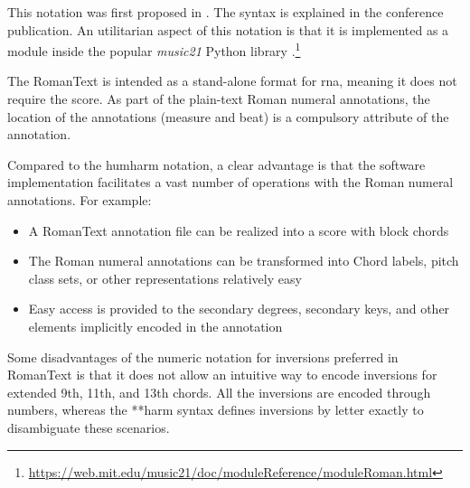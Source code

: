 

This notation was first proposed in
\textcite{gotham2019romantext}. The syntax is explained in
the conference publication. An utilitarian aspect of this
notation is that it is implemented as a module inside the
popular \emph{music21} Python library
\textcite{cuthbert2010music21}.\footnote{\href{https://web.mit.edu/music21/doc/moduleReference/moduleRoman.html}{https://web.mit.edu/music21/doc/moduleReference/moduleRoman.html}}


The RomanText is intended as a stand-alone format for
\gls{rna}, meaning it does not require the score. As part of
the plain-text Roman numeral annotations, the location of
the annotations (measure and beat) is a compulsory attribute
of the annotation.

Compared to the \gls{humharm} notation, a clear advantage is
that the software implementation facilitates a vast number
of operations with the Roman numeral annotations. For
example:

\begin{itemize}
    \item A RomanText annotation file can be realized into a
    score with block chords
    \item The Roman numeral annotations can be transformed
    into Chord labels, pitch class sets, or other
    representations relatively easy
    \item Easy access is provided to the secondary degrees,
    secondary keys, and other elements implicitly encoded in
    the annotation
\end{itemize}

Some disadvantages of the numeric notation for inversions
preferred in RomanText is that it does not allow an
intuitive way to encode inversions for extended 9th, 11th,
and 13th chords. All the inversions are encoded through
numbers, whereas the **harm syntax defines inversions by
letter exactly to disambiguate these scenarios.
